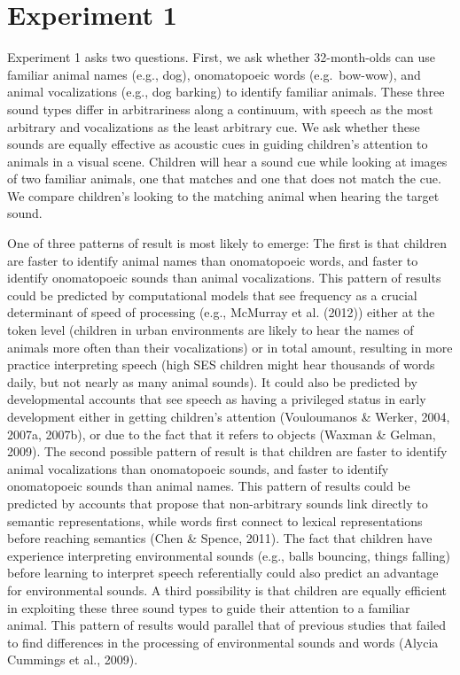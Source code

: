 \documentclass[english,floatsintext,man]{apa6}
\theoremstyle{definition}
\theoremstyle{definition}
\theoremstyle{definition}
\theoremstyle{remark}
\begin{document}
\section{Experiment 1}\label{experiment-1}

Experiment 1 asks two questions. First, we ask whether 32-month-olds can
use familiar animal names (e.g., dog), onomatopoeic words
(e.g.~bow-wow), and animal vocalizations (e.g., dog barking) to identify
familiar animals. These three sound types differ in arbitrariness along
a continuum, with speech as the most arbitrary and vocalizations as the
least arbitrary cue. We ask whether these sounds are equally effective
as acoustic cues in guiding children's attention to animals in a visual
scene. Children will hear a sound cue while looking at images of two
familiar animals, one that matches and one that does not match the cue.
We compare children's looking to the matching animal when hearing the
target sound.

One of three patterns of result is most likely to emerge: The first is
that children are faster to identify animal names than onomatopoeic
words, and faster to identify onomatopoeic sounds than animal
vocalizations. This pattern of results could be predicted by
computational models that see frequency as a crucial determinant of
speed of processing (e.g., McMurray et al. (2012)) either at the token
level (children in urban environments are likely to hear the names of
animals more often than their vocalizations) or in total amount,
resulting in more practice interpreting speech (high SES children might
hear thousands of words daily, but not nearly as many animal sounds). It
could also be predicted by developmental accounts that see speech as
having a privileged status in early development either in getting
children's attention (Vouloumanos \& Werker, 2004, 2007a, 2007b), or due
to the fact that it refers to objects (Waxman \& Gelman, 2009). The
second possible pattern of result is that children are faster to
identify animal vocalizations than onomatopoeic sounds, and faster to
identify onomatopoeic sounds than animal names. This pattern of results
could be predicted by accounts that propose that non-arbitrary sounds
link directly to semantic representations, while words first connect to
lexical representations before reaching semantics (Chen \& Spence,
2011). The fact that children have experience interpreting environmental
sounds (e.g., balls bouncing, things falling) before learning to
interpret speech referentially could also predict an advantage for
environmental sounds. A third possibility is that children are equally
efficient in exploiting these three sound types to guide their attention
to a familiar animal. This pattern of results would parallel that of
previous studies that failed to find differences in the processing of
environmental sounds and words (Alycia Cummings et al., 2009).
\end{document}
